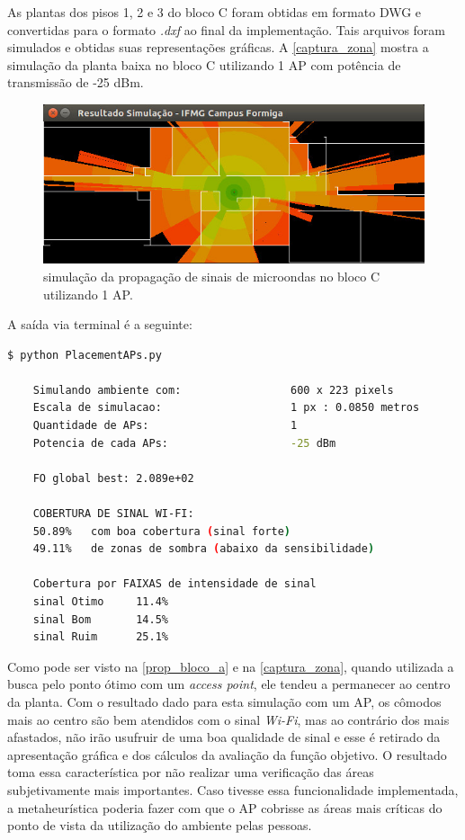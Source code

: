 \documentclass[
	12pt,				%
	openright,			%
	twoside,			%
	a4paper,			%
	english,			%
	french,				%
	spanish,			%
	brazil				%
	]{abntex2}
\begin{document}
As plantas dos pisos 1, 2 e 3 do bloco C foram obtidas em formato DWG e convertidas para o formato \textit{.dxf }ao final da implementação. Tais arquivos foram simulados e obtidas suas representações gráficas. A \autoref{captura_zona} mostra a simulação da planta baixa no bloco C utilizando 1 AP com potência de transmissão de -25 dBm.


\begin{figure}[ht]
	\caption{\label{captura_zona}simulação da propagação de sinais de microondas no bloco C utilizando 1 AP.
		}
	\begin{center}
		\includegraphics[scale=0.7]{images/captura-zona-2.jpg}
	\end{center}
\end{figure}

A saída via terminal é a seguinte:

\begin{lstlisting}[language=bash]
	$ python PlacementAPs.py 
	
	Simulando ambiente com:                 600 x 223 pixels
	Escala de simulacao:                    1 px : 0.0850 metros
	Quantidade de APs:                      1
	Potencia de cada APs:                   -25 dBm
	
	FO global best: 2.089e+02
	
	COBERTURA DE SINAL WI-FI:
	50.89%   com boa cobertura (sinal forte)
	49.11%   de zonas de sombra (abaixo da sensibilidade)
	
	Cobertura por FAIXAS de intensidade de sinal
	sinal Otimo     11.4%
	sinal Bom       14.5%
	sinal Ruim      25.1%

\end{lstlisting}

Como pode ser visto na \autoref{prop_bloco_a} e na \autoref{captura_zona}, quando utilizada a busca pelo ponto ótimo com um \textit{access point}, ele tendeu a permanecer ao centro da planta. Com o resultado dado para esta simulação com um AP, os cômodos mais ao centro são bem atendidos com o sinal \textit{Wi-Fi}, mas ao contrário dos mais afastados, não irão usufruir de uma boa qualidade de sinal e esse é retirado da apresentação gráfica e dos cálculos da avaliação da função objetivo. O resultado toma essa característica por não realizar uma verificação das áreas subjetivamente mais importantes. Caso tivesse essa funcionalidade implementada, a metaheurística poderia fazer com que o AP cobrisse as áreas mais críticas do ponto de vista da utilização do ambiente pelas pessoas.
\end{document}
